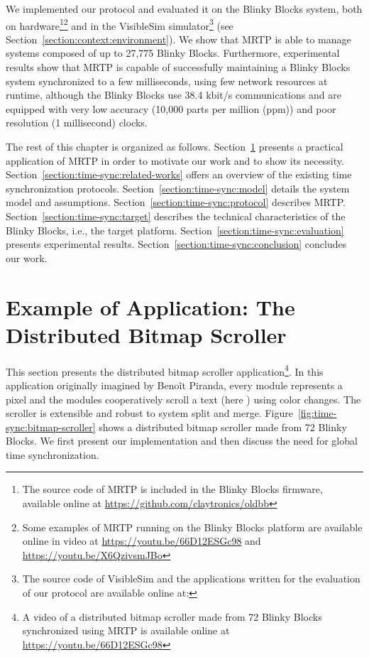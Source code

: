 We implemented our protocol and evaluated it on the Blinky Blocks system, both on hardware\footnote{The source code of MRTP is included in the Blinky Blocks firmware, available online at \url{https://github.com/claytronics/oldbb}}\footnote{Some examples of MRTP running on the Blinky Blocks platform are available online in video at \url{https://youtu.be/66D12ESGc98} and \url{https://youtu.be/X6QzivsmJBo}} and in the VisibleSim simulator\footnote{The source code of VisibleSim and the applications written for the evaluation of our protocol are available online at: \VisibleSimUrl{}} (see Section~\ref{section:context:environment}). We show that MRTP is able to manage systems composed of up to 27,775 Blinky Blocks. Furthermore, experimental results show that MRTP is capable of successfully maintaining a Blinky Blocks system synchronized to a few milliseconds, using few network resources at runtime, although the Blinky Blocks use 38.4 kbit/s communications and are equipped with very low accuracy (10,000 parts per million (ppm)) and poor resolution (1 millisecond) clocks.

The rest of this chapter is organized as follows. Section~\ref{section:time-sync:scroller} presents a practical application of MRTP in order to motivate our work and to show its necessity. Section~\ref{section:time-sync:related-works} offers an overview of the existing time synchronization protocols. Section~\ref{section:time-sync:model} details the system model and assumptions. Section~\ref{section:time-sync:protocol} describes MRTP. Section~\ref{section:time-sync:target} describes the technical characteristics of the  Blinky Blocks, i.e., the target platform. Section~\ref{section:time-sync:evaluation} presents experimental results. Section~\ref{section:time-sync:conclusion} concludes our work.

\section{Example of Application: The Distributed Bitmap Scroller}
\label{section:time-sync:scroller}

This section presents the distributed bitmap scroller application\footnote{A video of a distributed bitmap scroller made from 72 Blinky Blocks synchronized using MRTP is available online at \url{https://youtu.be/66D12ESGc98}}. In this application originally imagined by Beno{\^i}t Piranda, every module represents a pixel and the modules cooperatively scroll a text (here ) using color changes. The scroller is extensible and robust to system split and merge. Figure~\ref{fig:time-sync:bitmap-scroller} shows a distributed bitmap scroller made from 72 Blinky Blocks. We first present our implementation and then discuss the need for global time synchronization.

